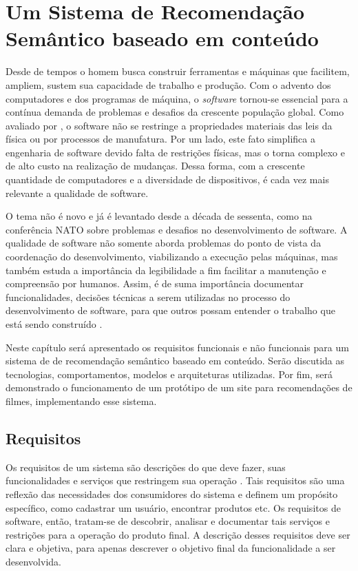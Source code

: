 \label{cap:proposal}
\chapter{Um Sistema de Recomendação Semântico baseado em conteúdo}

Desde de tempos o homem busca construir ferramentas e máquinas que facilitem, ampliem, sustem sua capacidade de trabalho e produção. Com o advento dos computadores e dos programas de máquina, o \textit{software} tornou-se essencial para a contínua demanda de problemas e desafios da crescente população global. Como avaliado por \cite{Sommerville2010},  o software não se restringe a propriedades materiais das leis da física ou por processos de manufatura. Por um lado, este fato simplifica a engenharia de software devido falta de restrições físicas, mas o torna complexo e de alto custo na realização de mudanças. Dessa forma, com a crescente quantidade de computadores e a diversidade de dispositivos, é cada vez mais relevante a qualidade de software.

O tema não é novo e já é levantado desde a década de sessenta, como na conferência NATO \citep{NR68} sobre problemas e desafios no desenvolvimento de software. A qualidade de software não somente aborda problemas do ponto de vista da coordenação do desenvolvimento, viabilizando a execução pelas máquinas, mas também estuda a importância da legibilidade a fim facilitar a manutenção e compreensão por humanos. Assim, é de suma importância documentar funcionalidades, decisões técnicas a serem utilizadas no processo do desenvolvimento de software, para que outros possam entender o trabalho que está sendo construído \citep{Pressman2009}.

Neste capítulo será apresentado os requisitos funcionais e não funcionais para um sistema de de recomendação semântico baseado em conteúdo. Serão discutida as tecnologias, comportamentos, modelos e arquiteturas utilizadas. Por fim, será demonstrado o funcionamento de um protótipo de um site para recomendações de filmes, implementando esse sistema.

\section{Requisitos}

Os requisitos de um sistema são descrições do que deve fazer, suas funcionalidades e serviços que restringem sua operação \citep{Sommerville2010}. Tais requisitos são uma reflexão das necessidades dos consumidores do sistema e definem um propósito específico, como cadastrar um usuário, encontrar produtos etc. Os requisitos de software, então, tratam-se de descobrir, analisar e documentar tais serviços e restrições para a operação do produto final. A descrição desses requisitos deve ser clara e objetiva, para apenas descrever o objetivo final da funcionalidade a ser desenvolvida.

